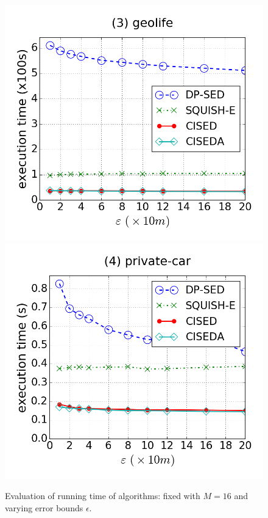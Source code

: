 \begin{figure}[tb!]
\includegraphics[scale = 0.250]{figures/Exp-time-epsilon-geolife.png}
\includegraphics[scale = 0.250]{figures/Exp-time-epsilon-private.png}
\vspace{-2ex}
\caption{\small Evaluation of running time of \lsa algorithms: fixed with $M=16$ and varying error bounds $\epsilon$.}
\label{fig:time-epsilon}
\vspace{-2ex}
\end{figure}



